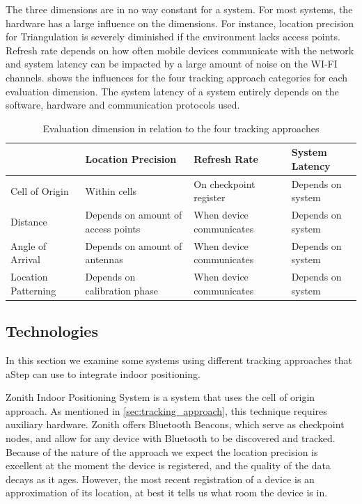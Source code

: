 The three dimensions are in no way constant for a system. For most systems, the hardware has a large influence on the dimensions. For instance, location precision for Triangulation is severely diminished if the environment lacks access points. Refresh rate depends on how often mobile devices communicate with the network and system latency can be impacted by a large amount of noise on the WI-FI channels.  shows the influences for the four tracking approach categories for each evaluation dimension. The system latency of a system entirely depends on the software, hardware and communication protocols used.

\begin{table}[]
\centering
\begin{tabular}{|l|p{4cm}|p{4cm}|p{3.5cm}|}
\hline
                    & Location Precision                 & Refresh Rate             & System Latency    \\ \hline
Cell of Origin      & Within cells                       & On checkpoint register   & Depends on system \\ \hline
Distance            & Depends on amount of access points & When device communicates & Depends on system \\ \hline
Angle of Arrival    & Depends on amount of antennas      & When device communicates & Depends on system \\ \hline
Location Patterning & Depends on calibration phase       & When device communicates & Depends on system \\ \hline
\end{tabular}
\caption{Evaluation dimension in relation to the four tracking approaches}
\label{tab:evaluating_approaches}
\end{table}

\subsection{Technologies}
In this section we examine some systems using different tracking approaches that aStep can use to integrate indoor positioning.

Zonith Indoor Positioning System is a system that uses the cell of origin approach. As mentioned in \cref{sec:tracking_approach}, this technique requires auxiliary hardware. Zonith offers Bluetooth Beacons, which serve as checkpoint nodes, and allow for any device with Bluetooth to be discovered and tracked\cite{zonith}.  Because of the nature of the approach we expect the location precision is excellent at the moment the device is registered, and the quality of the data decays as it ages. However, the most recent registration of a device is an approximation of its location, at best it tells us what room the device is in.

